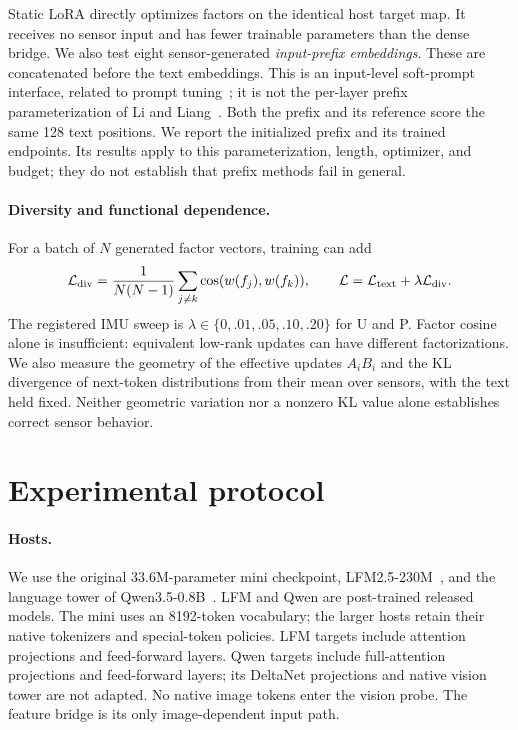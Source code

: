 \documentclass[11pt]{article}
\begin{document}
Static LoRA directly optimizes factors on the identical host target map. It
receives no sensor input and has fewer trainable parameters than the dense
bridge. We also test eight sensor-generated \emph{input-prefix embeddings}.
These are concatenated before the text embeddings. This is an input-level
soft-prompt interface, related to prompt tuning~\cite{lester2021power}; it is
not the per-layer prefix parameterization of Li and
Liang~\cite{li2021prefixtuning}. Both the prefix and its reference score the
same 128 text positions. We report the initialized prefix and its trained
endpoints. Its results apply to this parameterization, length, optimizer, and
budget; they do not establish that prefix methods fail in general.

\paragraph{Diversity and functional dependence.}
For a batch of $N$ generated factor vectors, training can add
\[
 \mathcal L_{\rm div}=\frac{1}{N(N-1)}\sum_{j\ne k}
 \cos(w(f_j),w(f_k)),\qquad
 \mathcal L=\mathcal L_{\rm text}+\lambda\mathcal L_{\rm div}.
\]
The registered IMU sweep is $\lambda\in\{0,.01,.05,.10,.20\}$ for U and P.
Factor cosine alone is insufficient: equivalent low-rank updates can have
different factorizations. We also measure the geometry of the effective
updates $A_iB_i$ and the KL divergence of next-token distributions from their
mean over sensors, with the text held fixed. Neither geometric variation nor a
nonzero KL value alone establishes correct sensor behavior.

\section{Experimental protocol}
\label{sec:protocol}
\paragraph{Hosts.}
We use the original 33.6M-parameter mini checkpoint,
LFM2.5-230M~\cite{liquid2026lfm}, and the language tower of
Qwen3.5-0.8B~\cite{qwen2026small}. LFM and Qwen are post-trained released
models. The mini uses an 8192-token vocabulary; the larger hosts retain their
native tokenizers and special-token policies. LFM targets include attention
projections and feed-forward layers. Qwen targets include full-attention
projections and feed-forward layers; its DeltaNet projections and native
vision tower are not adapted. No native image tokens enter the vision probe.
The feature bridge is its only image-dependent input path.
\end{document}
